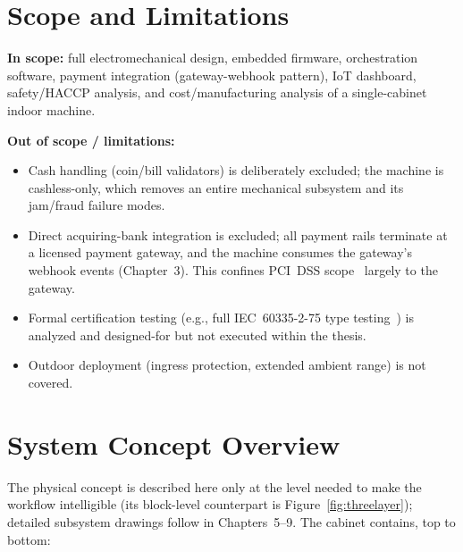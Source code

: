 \section{Scope and Limitations}
\label{sec:scope}

\textbf{In scope:} full electromechanical design, embedded firmware,
orchestration software, payment integration (gateway-webhook pattern),
IoT dashboard, safety/HACCP analysis, and cost/manufacturing analysis of a
single-cabinet indoor machine.

\textbf{Out of scope / limitations:}
\begin{itemize}[itemsep=1pt]
  \item Cash handling (coin/bill validators) is deliberately excluded; the
        machine is cashless-only, which removes an entire mechanical
        subsystem and its jam/fraud failure modes.
  \item Direct acquiring-bank integration is excluded; all payment rails
        terminate at a licensed payment gateway, and the machine consumes
        the gateway's webhook events (Chapter~3). This confines PCI~DSS
        scope~\cite{pcidss4} largely to the gateway.
  \item Formal certification testing (e.g., full IEC~60335-2-75 type
        testing~\cite{iec60335275}) is analyzed and designed-for but not
        executed within the thesis.
  \item Outdoor deployment (ingress protection, extended ambient range) is
        not covered.
\end{itemize}

\section{System Concept Overview}
\label{sec:concept}

The physical concept is described here only at the level needed to make the
workflow intelligible (its block-level counterpart is
Figure~\ref{fig:threelayer}); detailed subsystem drawings follow in
Chapters~5--9. The cabinet contains, top to bottom:

